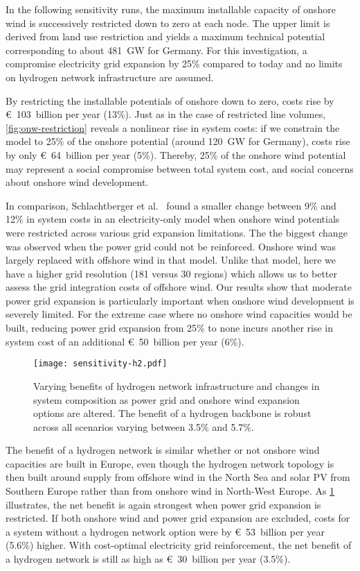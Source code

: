 In the following sensitivity runs, the maximum installable capacity of onshore
wind is successively restricted down to zero at each node. The upper limit is
derived from land use restriction and yields a maximum technical potential
corresponding to about \SI{481}{\giga\watt} for Germany. For this investigation,
a compromise electricity grid expansion by 25\% compared to today and no limits
on hydrogen network infrastructure are assumed.

By restricting the installable potentials of onshore down to zero, costs rise by
\euro~103~billion per year (13\%). Just as in the case of restricted line volumes,
\cref{fig:onw-restriction} reveals a nonlinear rise in system costs: if we
constrain the model to 25\% of the onshore potential (around 120~GW for Germany),
costs rise by only \euro~64~billion per year (5\%). Thereby, 25\% of the onshore
wind potential may represent a social compromise between total system cost, and
social concerns about onshore wind development.

In comparison, Schlachtberger et al.~ found
a smaller change between 9\% and 12\% in system costs in an electricity-only
model when onshore wind potentials were restricted across various grid expansion
limitations. The the biggest change was observed when the power grid could not
be reinforced. Onshore wind was largely replaced with offshore wind in that
model. Unlike that model, here we have a higher grid resolution (181 versus 30
regions) which allows us to better assess the grid integration costs of offshore
wind. Our results show that moderate power grid expansion is particularly
important when onshore wind development is severely limited. For the extreme
case where no onshore wind capacities would be built, reducing power grid
expansion from 25\% to none incurs another rise in system cost of an additional
\euro~50~billion per year (6\%).

\begin{figure}
    \centering
    \texttt{[image: sensitivity-h2.pdf]}
    \caption{Varying benefits of hydrogen network infrastructure and changes in system composition as power grid and onshore wind expansion options are altered. The benefit of a hydrogen backbone is robust across all scenarios varying between 3.5\% and 5.7\%.}
    \label{fig:h2-restriction-w-onw}
\end{figure}

The benefit of a hydrogen network is similar whether or not onshore wind
capacities are built in Europe, even though the hydrogen network topology is
then built around supply from offshore wind in the North Sea and solar PV from
Southern Europe rather than from onshore wind in North-West Europe. As
\cref{fig:h2-restriction-w-onw} illustrates, the net benefit is again strongest
when power grid expansion is restricted. If both onshore wind and power grid
expansion are excluded, costs for a system without a hydrogen network option
were by \euro~53~billion per year (5.6\%) higher. With cost-optimal electricity
grid reinforcement, the net benefit of a hydrogen network is still as high as
\euro~30~billion per year (3.5\%).


